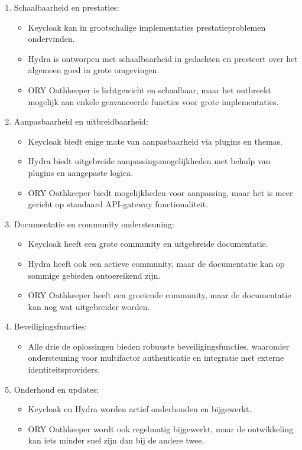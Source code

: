 \begin{enumerate}
  \item Schaalbaarheid en prestaties:
  \begin{itemize}
    \item Keycloak kan in grootschalige implementaties prestatieproblemen ondervinden.
    \item Hydra is ontworpen met schaalbaarheid in gedachten en presteert over het algemeen goed in grote omgevingen.
    \item ORY Oathkeeper is lichtgewicht en schaalbaar, maar het ontbreekt mogelijk aan enkele geavanceerde functies voor grote implementaties.
  \end{itemize}
  
  \item Aanpasbaarheid en uitbreidbaarheid:
  \begin{itemize}
    \item Keycloak biedt enige mate van aanpasbaarheid via plugins en themas.
    \item Hydra biedt uitgebreide aanpassingsmogelijkheden met behulp van plugins en aangepaste logica.
    \item ORY Oathkeeper biedt mogelijkheden voor aanpassing, maar het is meer gericht op standaard API-gateway functionaliteit.
  \end{itemize}
  
  \item Documentatie en community ondersteuning:
  \begin{itemize}
    \item Keycloak heeft een grote community en uitgebreide documentatie.
    \item Hydra heeft ook een actieve community, maar de documentatie kan op sommige gebieden ontoereikend zijn.
    \item ORY Oathkeeper heeft een groeiende community, maar de documentatie kan nog wat uitgebreider worden.
  \end{itemize}
  
  \item Beveiligingsfuncties:
  \begin{itemize}
    \item Alle drie de oplossingen bieden robuuste beveiligingsfuncties, waaronder ondersteuning voor multifactor authenticatie en integratie met externe identiteitsproviders.
  \end{itemize}
  
  \item Onderhoud en updates:
  \begin{itemize}
    \item Keycloak en Hydra worden actief onderhouden en bijgewerkt.
    \item ORY Oathkeeper wordt ook regelmatig bijgewerkt, maar de ontwikkeling kan iets minder snel zijn dan bij de andere twee.
  \end{itemize}
  

\end{enumerate}

